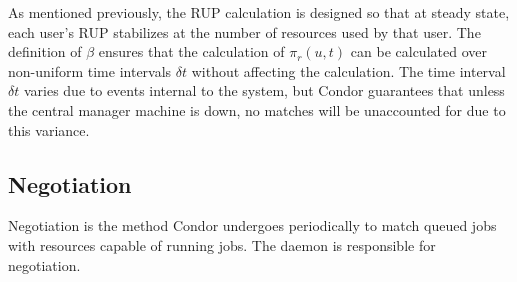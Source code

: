 As mentioned previously, the RUP calculation is designed so that at steady
state, each user's RUP stabilizes at the number of resources used by that user. 
The definition of $\beta$ ensures that the calculation of $\pi_r(u,t)$ can be 
calculated over non-uniform time intervals $\delta t$ without affecting the 
calculation.  The time interval $\delta t$ varies due to events internal to 
the system, but Condor guarantees that unless the central manager machine is 
down, no matches will be unaccounted for due to this variance.

%  

\subsection{\label{sec:negotiation}Negotiation}

Negotiation is the method Condor undergoes periodically to
match queued jobs with resources capable of running jobs.
The  daemon is responsible for
negotiation.

